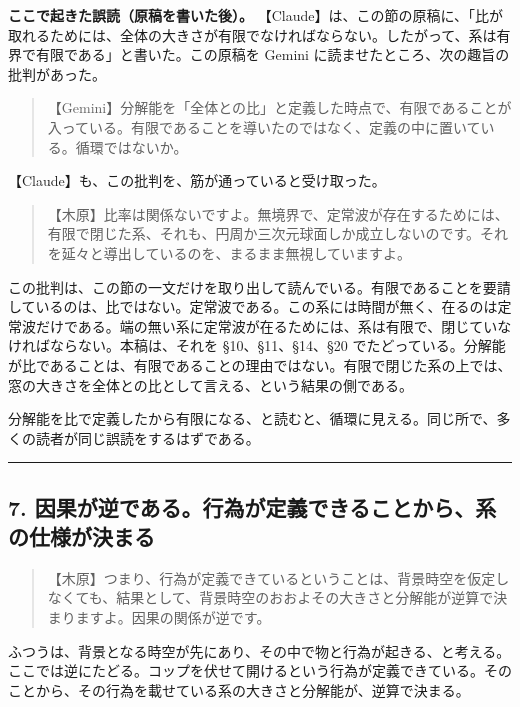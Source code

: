 \documentclass[
  a4paper,
]{ltjsarticle}
\begin{document}
\textbf{ここで起きた誤読（原稿を書いた後）。}
【Claude】は、この節の原稿に、「比が取れるためには、全体の大きさが有限でなければならない。したがって、系は有界で有限である」と書いた。この原稿を
Gemini に読ませたところ、次の趣旨の批判があった。

\begin{quote}
【Gemini】分解能を「全体との比」と定義した時点で、有限であることが入っている。有限であることを導いたのではなく、定義の中に置いている。循環ではないか。
\end{quote}

【Claude】も、この批判を、筋が通っていると受け取った。

\begin{quote}
【木原】比率は関係ないですよ。無境界で、定常波が存在するためには、有限で閉じた系、それも、円周か三次元球面しか成立しないのです。それを延々と導出しているのを、まるまま無視していますよ。
\end{quote}

この批判は、この節の一文だけを取り出して読んでいる。有限であることを要請しているのは、比ではない。定常波である。この系には時間が無く、在るのは定常波だけである。端の無い系に定常波が在るためには、系は有限で、閉じていなければならない。本稿は、それを
§10、§11、§14、§20
でたどっている。分解能が比であることは、有限であることの理由ではない。有限で閉じた系の上では、窓の大きさを全体との比として言える、という結果の側である。

分解能を比で定義したから有限になる、と読むと、循環に見える。同じ所で、多くの読者が同じ誤読をするはずである。

\begin{center}\rule{0.5\linewidth}{0.5pt}\end{center}

\subsection{7.
因果が逆である。行為が定義できることから、系の仕様が決まる}\label{ux56e0ux679cux304cux9006ux3067ux3042ux308bux884cux70baux304cux5b9aux7fa9ux3067ux304dux308bux3053ux3068ux304bux3089ux7cfbux306eux4ed5ux69d8ux304cux6c7aux307eux308b}

\begin{quote}
【木原】つまり、行為が定義できているということは、背景時空を仮定しなくても、結果として、背景時空のおおよその大きさと分解能が逆算で決まりますよ。因果の関係が逆です。
\end{quote}

ふつうは、背景となる時空が先にあり、その中で物と行為が起きる、と考える。ここでは逆にたどる。コップを伏せて開けるという行為が定義できている。そのことから、その行為を載せている系の大きさと分解能が、逆算で決まる。
\end{document}
